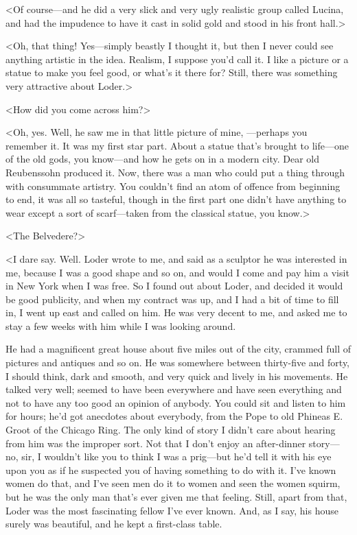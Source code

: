 <Of course—and he did a very slick and very ugly realistic group called Lucina, and had the impudence to have it cast in solid gold and stood in his front hall.>

<Oh, that thing! Yes—simply beastly I thought it, but then I never could see anything artistic in the idea. Realism, I suppose you'd call it. I like a picture or a statue to make you feel good, or what's it there for? Still, there was something very attractive about Loder.>

<How did you come across him?>

<Oh, yes. Well, he saw me in that little picture of mine, —perhaps you remember it. It was my first star part. About a statue that's brought to life—one of the old gods, you know—and how he gets on in a modern city. Dear old Reubenssohn produced it. Now, there was a man who could put a thing through with consummate artistry. You couldn't find an atom of offence from beginning to end, it was all so tasteful, though in the first part one didn't have anything to wear except a sort of scarf—taken from the classical statue, you know.>

<The Belvedere?>

<I dare say. Well. Loder wrote to me, and said as a sculptor he was interested in me, because I was a good shape and so on, and would I come and pay him a visit in New York when I was free. So I found out about Loder, and decided it would be good publicity, and when my contract was up, and I had a bit of time to fill in, I went up east and called on him. He was very decent to me, and asked me to stay a few weeks with him while I was looking around.

He had a magnificent great house about five miles out of the city, crammed full of pictures and antiques and so on. He was somewhere between thirty-five and forty, I should think, dark and smooth, and very quick and lively in his movements. He talked very well; seemed to have been everywhere and have seen everything and not to have any too good an opinion of anybody. You could sit and listen to him for hours; he'd got anecdotes about everybody, from the Pope to old Phineas E\@. Groot of the Chicago Ring. The only kind of story I didn't care about hearing from him was the improper sort. Not that I don't enjoy an after-dinner story—no, sir, I wouldn't like you to think I was a prig—but he'd tell it with his eye upon you as if he suspected you of having something to do with it. I've known women do that, and I've seen men do it to women and seen the women squirm, but he was the only man that's ever given me that feeling. Still, apart from that, Loder was the most fascinating fellow I've ever known. And, as I say, his house surely was beautiful, and he kept a first-class table.

